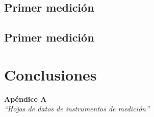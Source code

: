 \documentclass{article}
\begin{document}
\subsection{Primer medición}


\subsection{Primer medición}


\section{Conclusiones}

	
\bigskip\bigskip


\newpage \textit{}
\newpage



\newpage
\vspace*{4cm}
\begin{center}
	\textbf{\Huge{Apéndice A}} \\
	\bigskip\bigskip
	\Large{\textit{``Hojas de datos de instrumentos de medición''}}
\end{center}


\newpage \textit{}
\newpage
\end{document}
